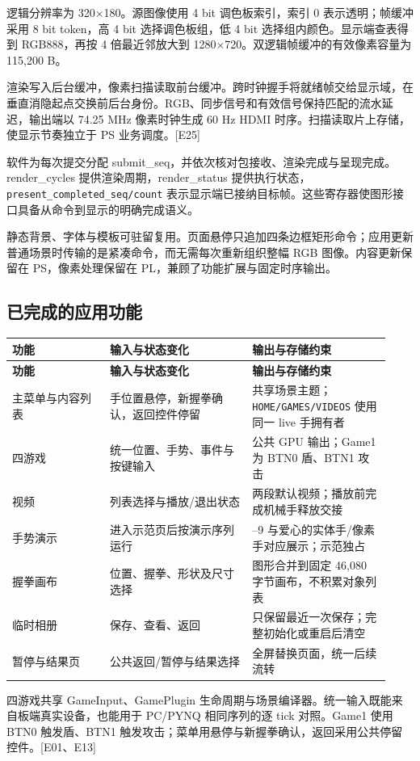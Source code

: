 逻辑分辨率为 320×180。源图像使用 4 bit 调色板索引，索引 0 表示透明；帧缓冲采用 8 bit token，高 4 bit 选择调色板组，低 4 bit 选择组内颜色。显示端查表得到 RGB888，再按 4 倍最近邻放大到 1280×720。双逻辑帧缓冲的有效像素容量为 115,200 B。

渲染写入后台缓冲，像素扫描读取前台缓冲。跨时钟握手将就绪帧交给显示域，在垂直消隐起点交换前后台身份。RGB、同步信号和有效信号保持匹配的流水延迟，输出端以 74.25 MHz 像素时钟生成 60 Hz HDMI 时序。扫描读取片上存储，使显示节奏独立于 PS 业务调度。[E25]

软件为每次提交分配 submit\_seq，并依次核对包接收、渲染完成与呈现完成。render\_cycles 提供渲染周期，render\_status 提供执行状态，\nolinkurl{present_completed_seq/count} 表示显示端已接纳目标帧。这些寄存器使图形接口具备从命令到显示的明确完成语义。

静态背景、字体与模板可驻留复用。页面悬停只追加四条边框矩形命令；应用更新普通场景时传输的是紧凑命令，而无需每次重新组织整幅 RGB 图像。内容更新保留在 PS，像素处理保留在 PL，兼顾了功能扩展与固定时序输出。

\subsection{已完成的应用功能}
{\small\renewcommand{\arraystretch}{1.28}
\begin{longtable}{@{}>{\raggedright\arraybackslash}p{0.24\linewidth}>{\raggedright\arraybackslash}p{0.35\linewidth}>{\raggedright\arraybackslash}p{0.34\linewidth}@{}}
\toprule
\bfseries 功能 & \bfseries 输入与状态变化 & \bfseries 输出与存储约束\\\midrule
\endfirsthead
\toprule
\bfseries 功能 & \bfseries 输入与状态变化 & \bfseries 输出与存储约束\\\midrule
\endhead
\bottomrule\endfoot
主菜单与内容列表 & 手位置悬停，新握拳确认，返回控件停留 & 共享场景主题；\nolinkurl{HOME/GAMES/VIDEOS} 使用同一 live 手拥有者\\
四游戏 & 统一位置、手势、事件与按键输入 & 公共 GPU 输出；Game1 为 BTN0 盾、BTN1 攻击\\
视频 & 列表选择与播放/退出状态 & 两段默认视频；播放前完成机械手释放交接\\
手势演示 & 进入示范页后按演示序列运行 & 0–9 与爱心的实体手/像素手对应展示；示范独占\\
握拳画布 & 位置、握拳、形状及尺寸选择 & 图形合并到固定 46,080 字节画布，不积累对象列表\\
临时相册 & 保存、查看、返回 & 只保留最近一次保存；完整初始化或重启后清空\\
暂停与结果页 & 公共返回/暂停与结果选择 & 全屏替换页面，统一后续流转\\
\end{longtable}}
四游戏共享 GameInput、GamePlugin 生命周期与场景编译器。统一输入既能来自板端真实设备，也能用于 PC/PYNQ 相同序列的逐 tick 对照。Game1 使用 BTN0 触发盾、BTN1 触发攻击；菜单用悬停与新握拳确认，返回采用公共停留控件。[E01、E13]

